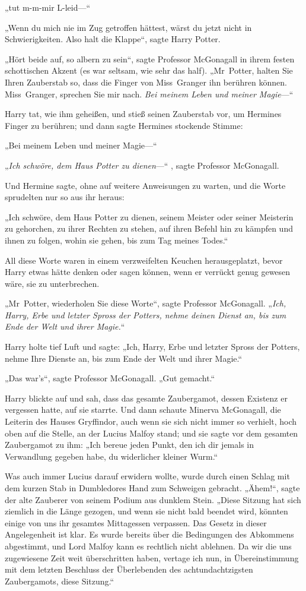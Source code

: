 {„tut m-m-mir L-leid—“

„Wenn du mich nie im Zug getroffen hättest, wärst du jetzt nicht in Schwierigkeiten. Also halt die Klappe“, sagte Harry Potter.

„Hört beide auf, so albern zu sein“, sagte Professor McGonagall in ihrem festen schottischen Akzent (es war seltsam, wie sehr das half). „Mr~Potter, halten Sie Ihren Zauberstab so, dass die Finger von Miss~Granger ihn berühren können. Miss~Granger, sprechen Sie mir nach. \emph{Bei meinem Leben und meiner Magie}—“

Harry tat, wie ihm geheißen, und stieß seinen Zauberstab vor, um Hermines Finger zu berühren; und dann sagte Hermines stockende Stimme:

„Bei meinem Leben und meiner Magie—“

„\emph{Ich schwöre, dem Haus Potter zu dienen}—“ , sagte Professor McGonagall.

Und Hermine sagte, ohne auf weitere Anweisungen zu warten, und die Worte sprudelten nur so aus ihr heraus:

„Ich schwöre, dem Haus Potter zu dienen, seinem Meister oder seiner Meisterin zu gehorchen, zu ihrer Rechten zu stehen, auf ihren Befehl hin zu kämpfen und ihnen zu folgen, wohin sie gehen, bis zum Tag meines Todes.“

All diese Worte waren in einem verzweifelten Keuchen herausgeplatzt, bevor Harry etwas hätte denken oder sagen können, wenn er verrückt genug gewesen wäre, sie zu unterbrechen.

„Mr~Potter, wiederholen Sie diese Worte“, sagte Professor McGonagall. „\emph{Ich, Harry, Erbe und letzter Spross der Potters, nehme deinen Dienst an, bis zum Ende der Welt und ihrer Magie.}“

Harry holte tief Luft und sagte: „Ich, Harry, Erbe und letzter Spross der Potters, nehme Ihre Dienste an, bis zum Ende der Welt und ihrer Magie.“

„Das war's“, sagte Professor McGonagall. „Gut gemacht.“

Harry blickte auf und sah, dass das gesamte Zaubergamot, dessen Existenz er vergessen hatte, auf sie starrte. Und dann schaute Minerva McGonagall, die Leiterin des Hauses Gryffindor, auch wenn sie sich nicht immer so verhielt, hoch oben auf die Stelle, an der Lucius Malfoy stand; und sie sagte vor dem gesamten Zaubergamot zu ihm: „Ich bereue jeden Punkt, den ich dir jemals in Verwandlung gegeben habe, du widerlicher kleiner Wurm.“

Was auch immer Lucius darauf erwidern wollte, wurde durch einen Schlag mit dem kurzen Stab in Dumbledores Hand zum Schweigen gebracht. „Ähem!“, sagte der alte Zauberer von seinem Podium aus dunklem Stein. „Diese Sitzung hat sich ziemlich in die Länge gezogen, und wenn sie nicht bald beendet wird, könnten einige von uns ihr gesamtes Mittagessen verpassen. Das Gesetz in dieser Angelegenheit ist klar. Es wurde bereits über die Bedingungen des Abkommens abgestimmt, und Lord Malfoy kann es rechtlich nicht ablehnen. Da wir die uns zugewiesene Zeit weit überschritten haben, vertage ich nun, in Übereinstimmung mit dem letzten Beschluss der Überlebenden des achtundachtzigsten Zaubergamots, diese Sitzung.“

}

